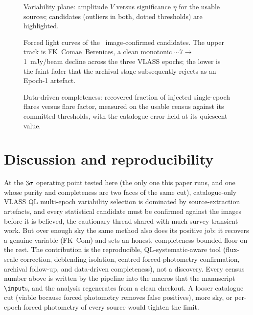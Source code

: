 \documentclass[twocolumn]{aastex631}
\newcommand{\code}[1]{\texttt{#1}}
\begin{document}
\begin{figure}
\caption{Variability plane: amplitude $V$ versus significance $\eta$ for the usable sources;
candidates (outliers in both, dotted thresholds) are highlighted.}
\label{fig:etav}
\end{figure}

\begin{figure}
\caption{Forced light curves of the \vlassRealNconfirmed\ image-confirmed candidates. The upper track is
FK~Comae~Berenices, a clean monotonic $\sim$7$\to$1~mJy/beam decline across the three VLASS epochs;
the lower is the faint fader that the archival stage subsequently rejects as an Epoch-1 artefact.}
\label{fig:fkcom}
\end{figure}

\begin{figure}
\caption{Data-driven completeness: recovered fraction of injected single-epoch flares versus flare
factor, measured on the usable census against its committed thresholds, with the catalogue error
held at its quiescent value.}
\label{fig:compl}
\end{figure}

\section{Discussion and reproducibility}
At the $3\sigma$ operating point tested here (the only one this paper runs, and one
whose purity and completeness are two faces of the same cut), catalogue-only VLASS QL multi-epoch
variability selection is dominated by source-extraction artefacts, and every statistical candidate
must be confirmed against the images before it is believed, the cautionary thread shared with much
survey transient work. But over enough sky the same method also does its positive job: it recovers
a genuine variable (FK~Com) and sets an honest, completeness-bounded floor on the rest. The
contribution is the reproducible, QL-systematic-aware tool (flux-scale correction, deblending
isolation, centred forced-photometry confirmation, archival follow-up, and data-driven
completeness), not a discovery. Every census number above is written by the pipeline
into the macros that the manuscript \code{\textbackslash input}s, and the analysis regenerates from a clean
checkout. A looser catalogue cut (viable because forced photometry removes false positives), more
sky, or per-epoch forced photometry of every source would tighten the limit.
\end{document}
